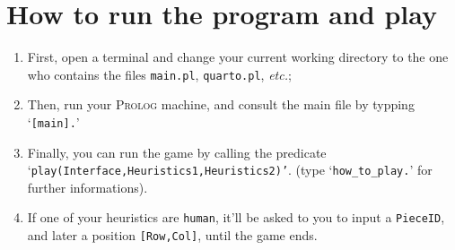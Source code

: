 \documentclass[a4paper,11pt]{article}
\newcommand{\tw}[1]{\texttt{#1}}
\begin{document}
	\section{How to run the program and play}
		\begin{enumerate}
			\item First, open a terminal and change your current working directory to the one who contains the files \tw{main.pl}, \tw{quarto.pl}, \textit{etc.};
			\item Then, run your \textsc{Prolog} machine, and consult the main file by typping `\tw{[main].}'
			\item Finally, you can run the game by calling the predicate `\tw{play(Interface,Heuristics1,Heuristics2)'}. (type `\tw{how\_to\_play.}' for further informations).
			\item If one of your heuristics are \tw{human}, it'll be asked to you to input a \tw{PieceID}, and later a position \tw{[Row,Col]}, until the game ends.
		\end{enumerate}
\end{document}

